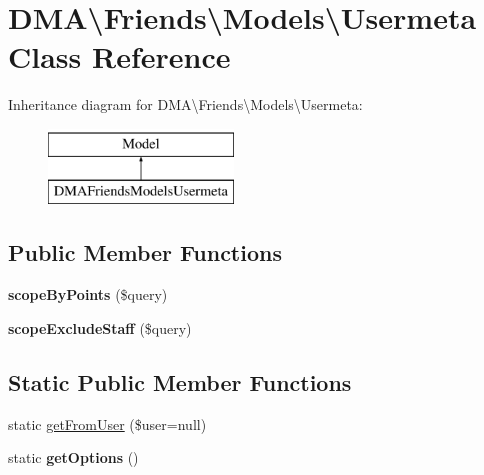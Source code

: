 \hypertarget{classDMA_1_1Friends_1_1Models_1_1Usermeta}{\section{D\+M\+A\textbackslash{}Friends\textbackslash{}Models\textbackslash{}Usermeta Class Reference}
\label{classDMA_1_1Friends_1_1Models_1_1Usermeta}
}
Inheritance diagram for D\+M\+A\textbackslash{}Friends\textbackslash{}Models\textbackslash{}Usermeta\+:\begin{figure}[H]
\begin{center}
\leavevmode
\includegraphics[height=2.000000cm]{d6/d87/classDMA_1_1Friends_1_1Models_1_1Usermeta}
\end{center}
\end{figure}
\subsection*{Public Member Functions}
\begin{DoxyCompactItemize}
\item 
\hypertarget{classDMA_1_1Friends_1_1Models_1_1Usermeta_ae00ecaf0d62b1ac7adc77184ae2fcbfa}{{\bfseries scope\+By\+Points} (\$query)}\label{classDMA_1_1Friends_1_1Models_1_1Usermeta_ae00ecaf0d62b1ac7adc77184ae2fcbfa}

\item 
\hypertarget{classDMA_1_1Friends_1_1Models_1_1Usermeta_a9b2ffa9c768ce6346269295d54d5cf4b}{{\bfseries scope\+Exclude\+Staff} (\$query)}\label{classDMA_1_1Friends_1_1Models_1_1Usermeta_a9b2ffa9c768ce6346269295d54d5cf4b}

\end{DoxyCompactItemize}
\subsection*{Static Public Member Functions}
\begin{DoxyCompactItemize}
\item 
static \hyperlink{classDMA_1_1Friends_1_1Models_1_1Usermeta_a9cfb688f15d66ee5a34c6437316d5d71}{get\+From\+User} (\$user=null)
\item 
\hypertarget{classDMA_1_1Friends_1_1Models_1_1Usermeta_a1acccb846d0ba68fcc9694cc0b1c4006}{static {\bfseries get\+Options} ()}\label{classDMA_1_1Friends_1_1Models_1_1Usermeta_a1acccb846d0ba68fcc9694cc0b1c4006}

\end{DoxyCompactItemize}
